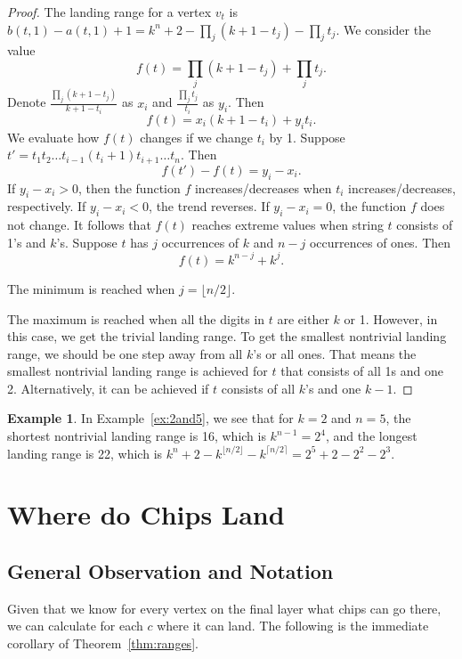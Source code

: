 \documentclass[11pt]{article}
\theoremstyle{definition}
\newtheorem{example}{Example}
\theoremstyle{remark}
\begin{document}
\begin{proof}
    The landing range for a vertex $v_t$ is $b(t, 1)-a(t, 1) + 1 = k^n+ 2 - \prod_j (k+1-t_j) - \prod_j t_j$. We consider the value
    \[f(t) = \prod_j (k+1-t_j) + \prod_j t_j.\]
    Denote $\frac{\prod_j (k+1-t_j)}{k+1-t_i}$ as $x_i$ and $\frac{\prod_j t_j}{t_i}$ as $y_i$. Then
    \[f(t) = x_i(k+1-t_i) +y_it_i.\]
    We evaluate how $f(t)$ changes if we change $t_i$ by 1. Suppose $t' = t_1t_2\dots t_{i-1}(t_i+1)t_{i+1}\dots t_n$. Then
    \[f(t') - f(t) = y_i - x_i.\]
    If $y_i - x_i > 0$, then the function $f$ increases/decreases when $t_i$ increases/decreases, respectively. If $y_i-x_i < 0$, the trend reverses. If $y_i - x_i = 0$, the function $f$ does not change. It follows that $f(t)$ reaches extreme values when string $t$ consists of 1's and $k$'s. Suppose $t$ has $j$ occurrences of $k$ and $n-j$ occurrences of ones. Then
    \[f(t) = k^{n-j} + k^j.\]
    
    The minimum is reached when $j = \lfloor n/2 \rfloor$.

    The maximum is reached when all the digits in $t$ are either $k$ or 1. However, in this case, we get the trivial landing range. To get the smallest nontrivial landing range, we should be one step away from all $k$'s or all ones. That means the smallest nontrivial landing range is achieved for $t$ that consists of all 1s and one 2. Alternatively, it can be achieved if $t$ consists of all $k$'s and one $k-1$. 
\end{proof}

\begin{example}
    In Example~\ref{ex:2and5}, we see that for $k=2$ and $n=5$, the shortest nontrivial landing range is 16, which is $k^{n-1} = 2^4$, and the longest landing range is 22, which is $k^n+2-k^{\lfloor n/2 \rfloor} -k^{\lceil n/2 \rceil} = 2^5 + 2 - 2^2 - 2^3$.
\end{example}


\section{Where do Chips Land}\label{sec:WheredoChipsLand}

\subsection{General Observation and Notation}

Given that we know for every vertex on the final layer what chips can go there, we can calculate for each $c$ where it can land. The following is the immediate corollary of Theorem~\ref{thm:ranges}.
\end{document}
